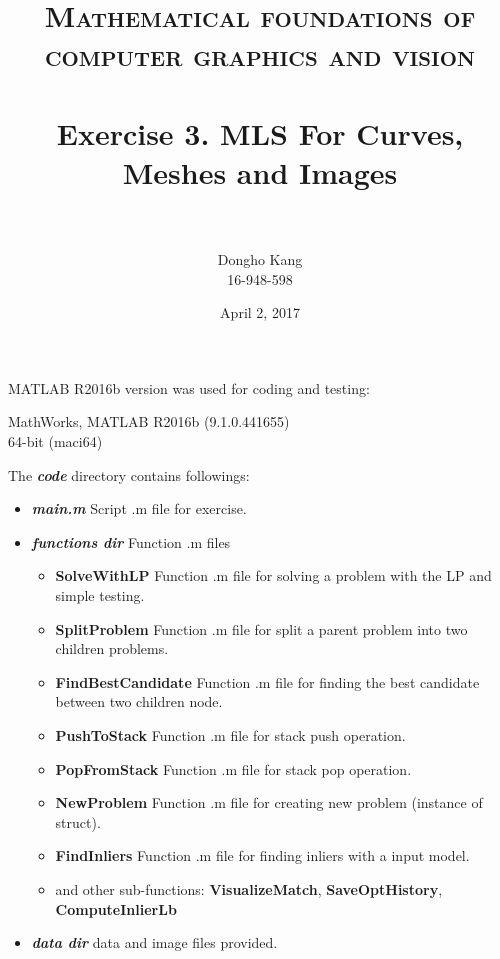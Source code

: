 \documentclass[paper=a4, fontsize=11pt]{scrartcl} %
\title{	
\normalfont \normalsize 
\textsc{Mathematical foundations of computer graphics and vision} \\ [25pt] %
\horrule{0.5pt} \\[0.4cm] %
\huge Exercise 3. MLS For Curves, Meshes and Images\\ %
\horrule{2pt} \\[0.5cm] %
}
\author{Dongho Kang \\ \small 16-948-598} %
\date{\normalsize April 2, 2017} %
\numberwithin{equation}{section} %
\numberwithin{figure}{section} %
\numberwithin{table}{section} %
\newcommand{\filename}[1]{\textbf{\textit{#1}}}
\newcommand{\funcname}[1]{\textbf{#1}}
\begin{document}
\maketitle %


MATLAB R2016b version was used for coding and testing:

\begin{center}
MathWorks, MATLAB R2016b (9.1.0.441655) \\
64-bit (maci64) 
\end{center}

The \filename{code} directory contains followings:

\begin{itemize}
	\item \filename{main.m} \quad Script .m file for exercise.
	\item \filename{functions dir} \quad Function .m files 
		\begin{itemize}
			\item \funcname{SolveWithLP} \quad Function .m file for solving a problem with the LP and simple testing.
			\item \funcname{SplitProblem} \quad Function .m file for split a parent problem into two children problems.
			\item \funcname{FindBestCandidate} \quad Function .m file for finding the best candidate between two children node.
			\item \funcname{PushToStack} \quad Function .m file for stack push operation.
			\item \funcname{PopFromStack} \quad Function .m file for stack pop operation.
			\item \funcname{NewProblem} \quad Function .m file for creating new problem (instance of struct).    
			\item \funcname{FindInliers} \quad Function .m file for finding inliers with a input model.    
			\item and other sub-functions: \funcname{VisualizeMatch}, \funcname{SaveOptHistory}, \funcname{ComputeInlierLb}
		\end{itemize}
	\item \filename{data dir} \quad data and image files provided.
\end{itemize}
\end{document}
